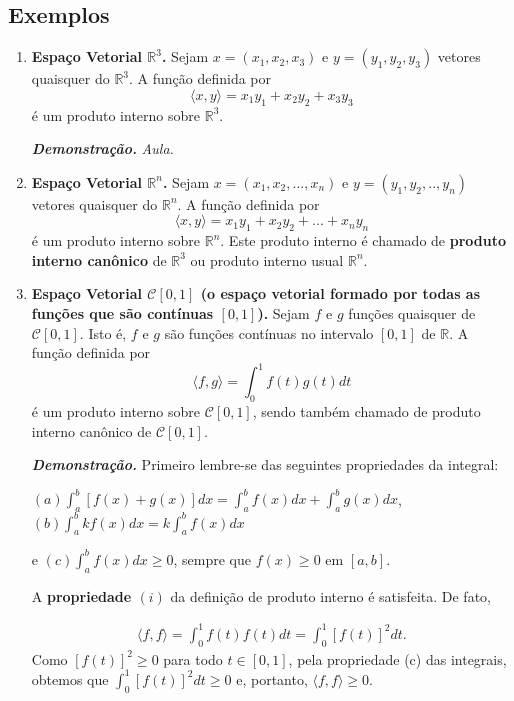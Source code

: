 \subsection{Exemplos}
\begin{enumerate}


\item  \textbf{Espaço Vetorial $\mathbb{R}^3$. } Sejam $x=(x_1, x_2, x_3)$ e $y=(y_1, y_2, y_3)$ vetores quaisquer do $ \mathbb{R}^3$. A função definida por
 $$\langle x, y \rangle = x_1y_1+x_2y_2+x_3y_3 $$ é um produto interno sobre $\mathbb{R}^3$.

\textbf{\textit{Demonstração.}} \textit{Aula.}

\item  \textbf{Espaço Vetorial $\mathbb{R}^n$. }  Sejam $x=(x_1, x_2,..., x_n)$ e $y=(y_1, y_2,.., y_n)$ vetores quaisquer do $ \mathbb{R}^n$. A função definida por
 $$\langle x, y \rangle = x_1y_1+x_2y_2+...+x_ny_n $$ é um produto interno sobre $\mathbb{R}^n$. Este produto interno é chamado de \textbf{produto interno canônico} de  $\mathbb{R}^3$    ou produto interno usual $\mathbb{R}^n$.


\item  \textbf{Espaço Vetorial  $\mathcal{C}[0,1]$ (o espaço vetorial formado por todas as funções que são  contínuas $[0,1]$). }  Sejam $f$ e $g$ funções quaisquer de  $\mathcal{C}[0,1]$. Isto é, $f$ e $g$ são funções contínuas no intervalo $[0,1]$ de $\mathbb{R}$. A função definida por
 $$\langle f, g \rangle = \int_{0}^{1}f(t)g(t)dt $$ é um produto interno sobre  $\mathcal{C}[0,1]$, sendo também  chamado de {produto interno canônico} de   $\mathcal{C}[0,1]$.

\textbf{\textit{Demonstração.}} Primeiro lembre-se das seguintes  propriedades da integral:

 $(a) \displaystyle  \int_{a}^{b}[f(x)+g(x)]dx=   \int_{a}^{b}f(x)dx +   \int_{a}^{b}g(x)dx$,   $ (b) \displaystyle\int_{a}^{b}kf(x)dx =  k \int_{a}^{b}f(x)dx $

e $(c) \displaystyle \int_{a}^{b}f(x)dx \geq 0$,  sempre que $f(x) \geq 0$ em $[a,b]$.

A \textbf{propriedade $(i)$} da definição de produto interno é satisfeita. De fato,

\begin{align*}
\langle f, f \rangle = \int_{0}^{1}f(t)f(t)dt=\int_{0}^{1}[f(t)]^2dt.
\end{align*}
Como  $[f(t)]^2 \geq 0$ para todo $t \in [0,1]$, pela propriedade (c) das integrais, obtemos que  $\displaystyle \int_{0}^{1}[f(t)]^2dt \geq 0$ e, portanto, $\langle f, f \rangle  \geq 0$.


\end{enumerate}
